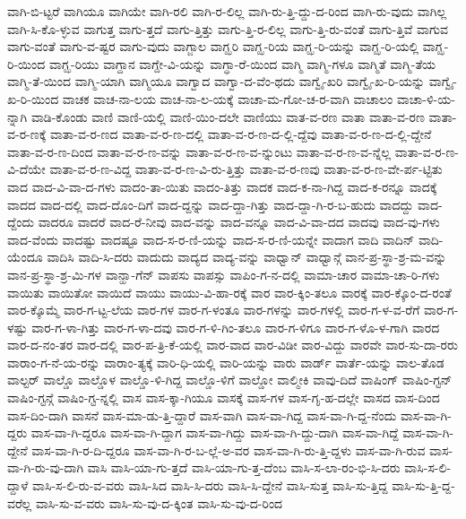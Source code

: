{ವಾಗಿ-ಬಿ-ಟ್ಟರೆ
ವಾಗಿಯೂ
ವಾಗಿಯೇ
ವಾಗಿ-ರಲಿ
ವಾಗಿ-ರ-ಲಿಲ್ಲ
ವಾಗಿ-ರು-ತ್ತಿ-ದ್ದು-ದ-ರಿಂದ
ವಾಗಿ-ರು-ವುದು
ವಾಗಿಲ್ಲ
ವಾಗಿ-ಸಿ-ಕೊ-ಳ್ಳುವ
ವಾಗುತ್ತ
ವಾಗು-ತ್ತದೆ
ವಾಗು-ತ್ತಿತ್ತು
ವಾಗು-ತ್ತಿ-ರ-ಲಿಲ್ಲ
ವಾಗು-ತ್ತಿ-ರು-ವಂತೆ
ವಾಗು-ತ್ತಿವೆ
ವಾಗುವ
ವಾಗು-ವಂತೆ
ವಾಗು-ವ-ಷ್ಟರ
ವಾಗು-ವುದು
ವಾಗ್ಜಾಲ
ವಾಗ್ಝರಿ
ವಾಗ್ಝ-ರಿಯ
ವಾಗ್ಝ-ರಿ-ಯನ್ನು
ವಾಗ್ಝ-ರಿ-ಯಲ್ಲಿ
ವಾಗ್ಝ-ರಿ-ಯಿಂದ
ವಾಗ್ಝ-ರಿಯು
ವಾಗ್ದಾನ
ವಾಗ್ದೇ-ವಿ-ಯನ್ನು
ವಾಗ್ಧಾ-ರೆ-ಯಿಂದ
ವಾಗ್ಮಿ
ವಾಗ್ಮಿ-ಗಳೂ
ವಾಗ್ಮಿತೆ
ವಾಗ್ಮಿ-ತೆಯ
ವಾಗ್ಮಿ-ತೆ-ಯಿಂದ
ವಾಗ್ಮಿ-ಯಾಗಿ
ವಾಗ್ಮಿಯೂ
ವಾಗ್ವಾದ
ವಾಗ್ವಾ-ದ-ವೆಂ-ಥದು
ವಾಗ್ವೈ-ಖರಿ
ವಾಗ್ವೈ-ಖ-ರಿ-ಯನ್ನು
ವಾಗ್ವೈ-ಖ-ರಿ-ಯಿಂದ
ವಾಚಕ
ವಾಚ-ನಾ-ಲಯ
ವಾಚ-ನಾ-ಲ-ಯಕ್ಕೆ
ವಾಚಾ-ಮ-ಗೋ-ಚ-ರ-ವಾಗಿ
ವಾಚಾಲಂ
ವಾಚಾ-ಳಿ-ಯ-ನ್ನಾಗಿ
ವಾಡಿ-ಕೊಂಡು
ವಾಣಿ
ವಾಣಿ-ಯಲ್ಲಿ
ವಾಣಿ-ಯಿಂ-ದಲೇ
ವಾಣಿಯು
ವಾತ-ವ-ರಣ
ವಾತಾ
ವಾತಾ-ವ-ರಣ
ವಾತಾ-ವ-ರ-ಣಕ್ಕೆ
ವಾತಾ-ವ-ರ-ಣದ
ವಾತಾ-ವ-ರ-ಣ-ದಲ್ಲಿ
ವಾತಾ-ವ-ರ-ಣ-ದ-ಲ್ಲಿ-ದ್ದೆವು
ವಾತಾ-ವ-ರ-ಣ-ದ-ಲ್ಲಿ-ದ್ದೇನೆ
ವಾತಾ-ವ-ರ-ಣ-ದಿಂದ
ವಾತಾ-ವ-ರ-ಣ-ವನ್ನು
ವಾತಾ-ವ-ರ-ಣ-ವ-ನ್ನುಂಟು
ವಾತಾ-ವ-ರ-ಣ-ವ-ನ್ನೆಲ್ಲ
ವಾತಾ-ವ-ರ-ಣ-ವಿ-ದೆಯೇ
ವಾತಾ-ವ-ರ-ಣ-ವಿದ್ದ
ವಾತಾ-ವ-ರ-ಣ-ವಿ-ರು-ತ್ತಿತ್ತು
ವಾತಾ-ವ-ರ-ಣವು
ವಾತಾ-ವ-ರ-ಣ-ವೇ-ರ್ಪ-ಟ್ಟಿತು
ವಾದ
ವಾದ-ವಿ-ವಾ-ದ-ಗಳು
ವಾದಂ-ತಾ-ಯಿತು
ವಾದಂ-ತಿತ್ತು
ವಾದಕ
ವಾದ-ಕ-ನಾ-ಗಿದ್ದ
ವಾದ-ಕ-ರನ್ನೂ
ವಾದಕ್ಕೆ
ವಾದದ
ವಾದ-ದಲ್ಲಿ
ವಾದ-ದೊಂ-ದಿಗೆ
ವಾದ-ದ್ದನ್ನು
ವಾದ-ದ್ದಾ-ಗಿತ್ತು
ವಾದ-ದ್ದಾ-ಗಿ-ರ-ಬ-ಹುದು
ವಾದದ್ದು
ವಾದ-ದ್ದೆಂದು
ವಾದರೂ
ವಾದರೆ
ವಾದ-ರೆ-ನೀವು
ವಾದ-ವನ್ನು
ವಾದ-ವನ್ನೂ
ವಾದ-ವಿ-ವಾ-ದದ
ವಾದವು
ವಾದ-ವು-ಗಳು
ವಾದ-ವೆಂದು
ವಾದಷ್ಟು
ವಾದಷ್ಟೂ
ವಾದ-ಸ-ರ-ಣಿ-ಯನ್ನು
ವಾದ-ಸ-ರ-ಣಿ-ಯನ್ನೇ
ವಾದಾಗ
ವಾದಿ
ವಾದಿನ್
ವಾದಿ-ಯೆಂದೂ
ವಾದಿಸಿ
ವಾದಿ-ಸಿ-ದರು
ವಾದುದು
ವಾದ್ಯದ
ವಾದ್ಯ-ವನ್ನು
ವಾಧ್ವಾನ್
ವಾಧ್ವಾನ್ಗೆ
ವಾನ-ಪ್ರ-ಸ್ಥಾ-ಶ್ರ-ಮ-ವನ್ನು
ವಾನ-ಪ್ರ-ಸ್ಥಾ-ಶ್ರ-ಮಿ-ಗಳ
ವಾನ್ಹಾ-ಗೆನ್
ವಾಪಸು
ವಾಪಸ್ಸು
ವಾಪಿಂ-ಗ-ನ-ದಲ್ಲಿ
ವಾಮಾ-ಚಾರ
ವಾಮಾ-ಚಾ-ರಿ-ಗಳು
ವಾಯಿತು
ವಾಯಿತೋ
ವಾಯಿದೆ
ವಾಯು
ವಾಯು-ವಿ-ಹಾ-ರಕ್ಕೆ
ವಾರ
ವಾರ-ಕ್ಕಿಂ-ತಲೂ
ವಾರಕ್ಕೆ
ವಾರ-ಕ್ಕೊಂ-ದ-ರಂತೆ
ವಾರ-ಕ್ಕೊಮ್ಮೆ
ವಾರ-ಗ-ಟ್ಟ-ಲೆಯ
ವಾರ-ಗಳ
ವಾರ-ಗ-ಳಂತೂ
ವಾರ-ಗಳನ್ನು
ವಾರ-ಗಳಲ್ಲಿ
ವಾರ-ಗ-ಳ-ವ-ರೆಗೆ
ವಾರ-ಗ-ಳಷ್ಟು
ವಾರ-ಗ-ಳಾ-ಗಿತ್ತು
ವಾರ-ಗ-ಳಾ-ದವು
ವಾರ-ಗ-ಳಿ-ಗಿಂ-ತಲೂ
ವಾರ-ಗ-ಳಿಗೂ
ವಾರ-ಗ-ಳೊ-ಳ-ಗಾಗಿ
ವಾರದ
ವಾರ-ದ-ನಂ-ತರ
ವಾರ-ದಲ್ಲಿ
ವಾರ-ಪ-ತ್ರಿ-ಕೆ-ಯಲ್ಲಿ
ವಾರ-ವಾದ
ವಾರ-ವಿಡೀ
ವಾರ-ವಿದ್ದು
ವಾರವೇ
ವಾರ-ಸು-ದಾ-ರರು
ವಾರಾಂ-ಗ-ನೆ-ಯ-ರನ್ನು
ವಾರಾಂ-ತ್ಯಕ್ಕೆ
ವಾರಿ-ಧಿ-ಯಲ್ಲಿ
ವಾರಿ-ಯನ್ನು
ವಾರು
ವಾರ್ಡ್
ವಾರ್ತೆ-ಯನ್ನು
ವಾಲ-ತೊಡ
ವಾಲ್ಟರ್
ವಾಲ್ಡೊ
ವಾಲ್ಡೊಳ
ವಾಲ್ಡೊ-ಳಿ-ಗಿದ್ದ
ವಾಲ್ಡೊ-ಳಿಗೆ
ವಾಲ್ಡೋ
ವಾಲ್ಮೀಕಿ
ವಾವು-ದಿದೆ
ವಾಷಿಂಗ್
ವಾಷಿಂ-ಗ್ಟನ್
ವಾಷಿಂ-ಗ್ಟನ್ಗೆ
ವಾಷಿಂ-ಗ್ಟ-ನ್ನಲ್ಲಿ
ವಾಸ
ವಾಸ-ಕ್ಕಾ-ಗಿಯೂ
ವಾಸಕ್ಕೆ
ವಾಸ-ಗಳ
ವಾಸ-ಗೃ-ಹ-ದಲ್ಲೇ
ವಾಸದ
ವಾಸ-ದಿಂದ
ವಾಸ-ದಿಂ-ದಾಗಿ
ವಾಸನೆ
ವಾಸ-ಮಾ-ಡು-ತ್ತಿ-ದ್ದಾರೆ
ವಾಸ-ವಾಗಿ
ವಾಸ-ವಾ-ಗಿದ್ದ
ವಾಸ-ವಾ-ಗಿ-ದ್ದ-ನೆಂದು
ವಾಸ-ವಾ-ಗಿ-ದ್ದರು
ವಾಸ-ವಾ-ಗಿ-ದ್ದರೂ
ವಾಸ-ವಾ-ಗಿ-ದ್ದಾಗ
ವಾಸ-ವಾ-ಗಿದ್ದು
ವಾಸ-ವಾ-ಗಿ-ದ್ದು-ದಾಗಿ
ವಾಸ-ವಾ-ಗಿದ್ದೆ
ವಾಸ-ವಾ-ಗಿ-ದ್ದೇನೆ
ವಾಸ-ವಾ-ಗಿ-ರ-ದಿ-ದ್ದರೂ
ವಾಸ-ವಾ-ಗಿ-ರ-ಬ-ಲ್ಲೆ-ಅ-ವರ
ವಾಸ-ವಾ-ಗಿ-ರು-ತ್ತಿ-ದ್ದಳು
ವಾಸ-ವಾ-ಗಿ-ರುವ
ವಾಸ-ವಾ-ಗಿ-ರು-ವು-ದಾಗಿ
ವಾಸಿ
ವಾಸಿ-ಯಾ-ಗು-ತ್ತದೆ
ವಾಸಿ-ಯಾ-ಗು-ತ್ತ-ದೆಂಬ
ವಾಸಿ-ಸ-ಲಾ-ರಂ-ಭಿ-ಸಿ-ದರು
ವಾಸಿ-ಸ-ಲಿ-ದ್ದಾಳೆ
ವಾಸಿ-ಸ-ಲಿ-ರು-ವ-ವರು
ವಾಸಿ-ಸಿದ
ವಾಸಿ-ಸಿ-ದರು
ವಾಸಿ-ಸಿ-ದ್ದೇನೆ
ವಾಸಿ-ಸುತ್ತ
ವಾಸಿ-ಸು-ತ್ತಿದ್ದ
ವಾಸಿ-ಸು-ತ್ತಿ-ದ್ದ-ವರೆಲ್ಲ
ವಾಸಿ-ಸು-ವ-ವರು
ವಾಸಿ-ಸು-ವು-ದ-ಕ್ಕಿಂತ
ವಾಸಿ-ಸು-ವು-ದ-ರಿಂದ
}
